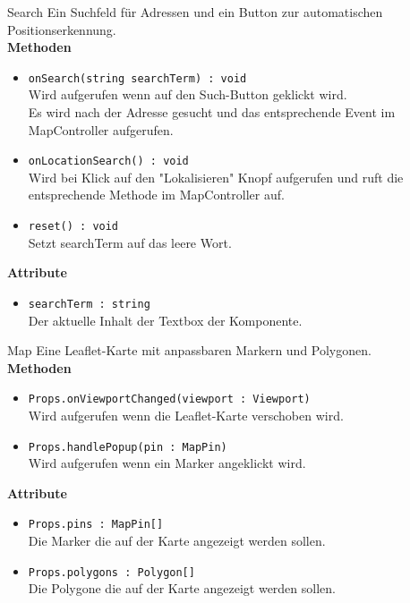     \begin{Class}{Search}
        Ein Suchfeld für Adressen und ein Button zur automatischen Positionserkennung.
        \bigskip\\
        \textbf{Methoden}
        \begin{itemize}
            \item \texttt{onSearch(string searchTerm) : void}
            \\ Wird aufgerufen wenn auf den Such-Button geklickt wird.
            \\ Es wird nach der Adresse gesucht und das entsprechende Event im MapController aufgerufen.
            \item \texttt{onLocationSearch() : void}
            \\ Wird bei Klick auf den "Lokalisieren" Knopf aufgerufen und ruft die entsprechende Methode im MapController auf.
            \item \texttt{reset() : void}
            \\ Setzt searchTerm auf das leere Wort.
        \end{itemize}
        \textbf{Attribute}
        \begin{itemize}
            \item \texttt{searchTerm : string}
            \\ Der aktuelle Inhalt der Textbox der Komponente.
        \end{itemize}
    \end{Class}
    
    \begin{Class}{Map}
        Eine Leaflet-Karte mit anpassbaren Markern und Polygonen.
        \bigskip\\
        \textbf{Methoden}
        \begin{itemize}
            \item \texttt{Props.onViewportChanged(viewport : Viewport)}
            \\ Wird aufgerufen wenn die Leaflet-Karte verschoben wird.
            \item \texttt{Props.handlePopup(pin : MapPin)}
            \\ Wird aufgerufen wenn ein Marker angeklickt wird.
        \end{itemize}
        \textbf{Attribute}
        \begin{itemize}
            \item \texttt{Props.pins : MapPin[]}
            \\ Die Marker die auf der Karte angezeigt werden sollen.
            \item \texttt{Props.polygons : Polygon[]}
            \\ Die Polygone die auf der Karte angezeigt werden sollen.
        \end{itemize}
    \end{Class}
    
